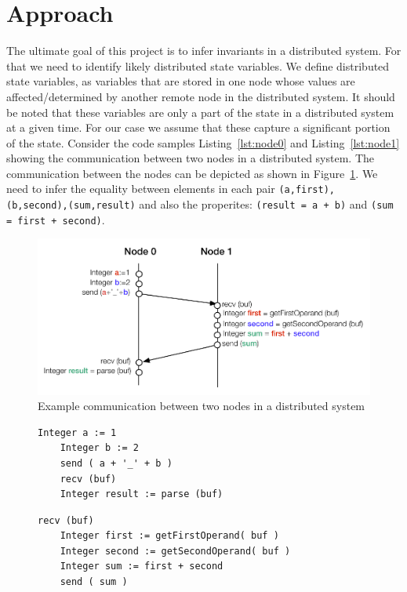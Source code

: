 \section{Approach}

The ultimate goal of this project is to infer invariants in a
distributed system. For that we need to identify likely distributed
state variables. We define distributed state variables,  as variables
that are stored in one node whose values are affected/determined by
another remote node in the distributed system. It should be noted that
these variables are only a part of the state in a distributed system
at a given time. For our case we assume that these capture a
significant portion of the state. Consider the code samples
Listing~\ref{lst:node0} and Listing~\ref{lst:node1} showing the
communication between two nodes in a distributed system. The
communication between the nodes can be depicted as shown in
Figure~\ref{fig:sample_code_diag}. We need to infer the equality
between elements in each pair \texttt{(a,first),
(b,second),(sum,result)} and also the properites: \texttt{(result = a
+ b)} and \texttt{(sum = first + second)}.


\begin{figure}
  \includegraphics[width=\columnwidth]{sample_code.pdf}
  \caption{Example communication between two nodes in a distributed system}
  \label{fig:sample_code_diag}
\end{figure}

\begin{figure}
\begin{lstlisting}[caption={Sample code for Communication between 2 nodes - Node 0}, label=lst:node0]
    Integer a := 1
    Integer b := 2
    send ( a + '_' + b )
    recv (buf)
    Integer result := parse (buf)
\end{lstlisting}
\end{figure}

\begin{figure}
\begin{lstlisting}[caption={Sample code for Communication between 2 nodes - Node 1}, label=lst:node1]
    recv (buf)
    Integer first := getFirstOperand( buf )
    Integer second := getSecondOperand( buf )
    Integer sum := first + second
    send ( sum )
\end{lstlisting}
\end{figure}


